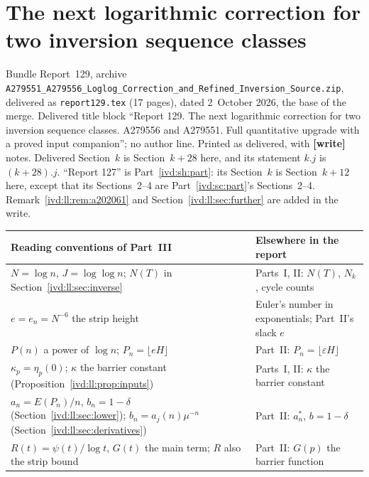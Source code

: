 \documentclass[11pt,letterpaper]{article}
\theoremstyle{remark}\newtheorem{remark}[theorem]{Remark}
\numberwithin{equation}{section}
\newcommand{\file}[1]{\nolinkurl{#1}}
\newcommand{\partsource}[1]{\par\noindent\begin{minipage}{\textwidth}\small #1\end{minipage}\par\medskip}
\begin{document}
\part{The next logarithmic correction for two inversion sequence classes}\label{ivd:ll:part}
\partsource{Bundle Report~129, archive \file{A279551_A279556_Loglog_Correction_and_Refined_Inversion_Source.zip}, delivered as \file{report129.tex} (17 pages), dated 2~October 2026, the base of the merge. Delivered title block ``Report 129. The next logarithmic correction for two inversion sequence classes. A279556 and A279551. Full quantitative upgrade with a proved input companion''; no author line. Printed as delivered, with \textbf{[write]} notes. Delivered Section~$k$ is Section~$k+28$ here, and its statement $k.j$ is $(k+28).j$. ``Report 127'' is Part~\ref{ivd:sh:part}: its Section~$k$ is Section~$k+12$ here, except that its Sections~2--4 are Part~\ref{ivd:sc:part}'s Sections~2--4. Remark~\ref{ivd:ll:rem:a202061} and Section~\ref{ivd:ll:sec:further} are added in the write.}
\begin{center}
\small
\begin{tabular}{@{}>{\raggedright\arraybackslash}p{} >{\raggedright\arraybackslash}p{}@{}}
\toprule
Reading conventions of Part~III & Elsewhere in the report\\
\midrule
$N=\log n$, $J=\log\log n$; $N(T)$ in Section~\ref{ivd:ll:sec:inverse} & Parts~I, II: $N(T)$, $N_k$, cycle counts\\
$e=e_n=N^{-6}$ the strip height & Euler's number in exponentials; Part~II's slack $e$\\
$P(n)$ a power of $\log n$; $P_n=\lfloor eH\rfloor$ & Part~II: $P_n=\lfloor\varepsilon H\rfloor$\\
$\kappa_p=\eta_p(0)$; $\kappa$ the barrier constant (Proposition~\ref{ivd:ll:prop:inputs}) & Parts~I, II: $\kappa$ the barrier constant\\
$a_n=E(P_n)/n$, $b_n=1-\delta$ (Section~\ref{ivd:ll:sec:lower}); $b_n=a_j(n)\mu^{-n}$ (Section~\ref{ivd:ll:sec:derivatives}) & Part~II: $a_n^*$, $b=1-\delta$\\
$R(t)=\psi(t)/\log t$, $G(t)$ the main term; $R$ also the strip bound & Part~II: $G(p)$ the barrier function\\
\bottomrule
\end{tabular}
\end{center}
\end{document}
